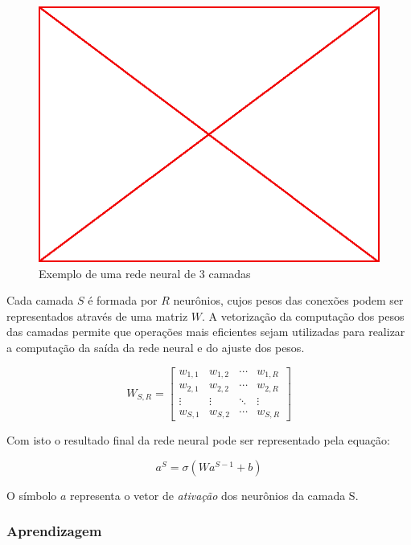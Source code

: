 \begin{figure}
\label{fig:003-nn}
  \caption{Exemplo de uma rede neural de 3 camadas}
  \begin{center}
    \includegraphics[scale=0.5]{placeholder}
  \end{center}
\end{figure}

Cada camada $S$ é formada por $R$ neurônios, cujos pesos das conexões podem ser
representados através de uma matriz $W$. A vetorização da computação dos pesos
das camadas permite que operações mais eficientes sejam utilizadas para
realizar a computação da saída da rede neural e do ajuste dos pesos.

$$ W_{S,R} =
\begin{bmatrix}
  w_{1,1} & w_{1,2} & \cdots & w_{1,R} \\
  w_{2,1} & w_{2,2} & \cdots & w_{2,R} \\
  \vdots  & \vdots  & \ddots & \vdots  \\
  w_{S,1} & w_{S,2} & \cdots & w_{S,R}
\end{bmatrix}
$$

Com isto o resultado final da rede neural pode ser representado pela equação:

$$ a^{S} = \sigma(Wa^{S-1}+b)$$

O símbolo $a$ representa o vetor de \emph{ativação} dos neurônios da camada S.

\subsubsection{Aprendizagem}

